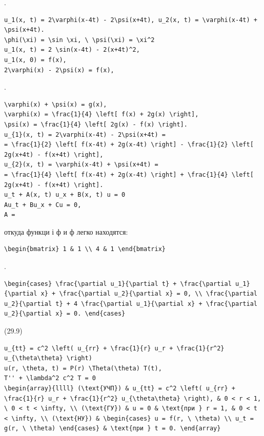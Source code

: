 \documentclass[
  ukrainian,
]{article}
\begin{document}
.

\begin{verbatim}
u_1(x, t) = 2\varphi(x-4t) - 2\psi(x+4t), u_2(x, t) = \varphi(x-4t) + \psi(x+4t).
\phi(\xi) = \sin \xi, \ \psi(\xi) = \xi^2
u_1(x, t) = 2 \sin(x-4t) - 2(x+4t)^2,
u_1(x, 0) = f(x),
2\varphi(x) - 2\psi(x) = f(x),
\end{verbatim}

.

\begin{verbatim}
\varphi(x) + \psi(x) = g(x),
\varphi(x) = \frac{1}{4} \left[ f(x) + 2g(x) \right],
\psi(x) = \frac{1}{4} \left[ 2g(x) - f(x) \right].
u_{1}(x, t) = 2\varphi(x-4t) - 2\psi(x+4t) =
= \frac{1}{2} \left[ f(x-4t) + 2g(x-4t) \right] - \frac{1}{2} \left[ 2g(x+4t) - f(x+4t) \right],
u_{2}(x, t) = \varphi(x-4t) + \psi(x+4t) =
= \frac{1}{4} \left[ f(x-4t) + 2g(x-4t) \right] + \frac{1}{4} \left[ 2g(x+4t) - f(x+4t) \right].
u_t + A(x, t) u_x + B(x, t) u = 0
Au_t + Bu_x + Cu = 0,
A =
\end{verbatim}

откуда функци і ф и ф легко находятся:

\begin{verbatim}
\begin{bmatrix} 1 & 1 \\ 4 & 1 \end{bmatrix}
\end{verbatim}

.

\begin{verbatim}
\begin{cases} \frac{\partial u_1}{\partial t} + \frac{\partial u_1}{\partial x} + \frac{\partial u_2}{\partial x} = 0, \\ \frac{\partial u_2}{\partial t} + 4 \frac{\partial u_1}{\partial x} + \frac{\partial u_2}{\partial x} = 0. \end{cases}
\end{verbatim}

(29.9)

\begin{verbatim}
u_{tt} = c^2 \left( u_{rr} + \frac{1}{r} u_r + \frac{1}{r^2} u_{\theta\theta} \right)
u(r, \theta, t) = P(r) \Theta(\theta) T(t),
T'' + \lambda^2 c^2 T = 0
\begin{array}{llll} (\text{УЧП}) & u_{tt} = c^2 \left( u_{rr} + \frac{1}{r} u_r + \frac{1}{r^2} u_{\theta\theta} \right), & 0 < r < 1, \ 0 < t < \infty, \\ (\text{ГУ}) & u = 0 & \text{при } r = 1, & 0 < t < \infty, \\ (\text{НУ}) & \begin{cases} u = f(r, \ \theta) \\ u_t = g(r, \ \theta) \end{cases} & \text{при } t = 0. \end{array}
\end{verbatim}
\end{document}
